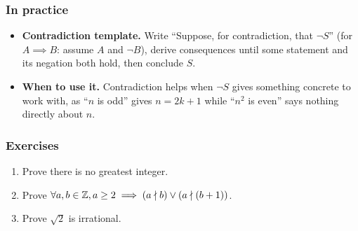\subsubsection*{In practice}
\begin{itemize}
    \item \textbf{Contradiction template.} Write ``Suppose, for contradiction, that $\neg S$'' (for $A\implies B$: assume $A$ and $\neg B$), derive consequences until some statement and its negation both hold, then conclude $S$.
    \item \textbf{When to use it.} Contradiction helps when $\neg S$ gives something concrete to work with, as ``$n$ is odd'' gives $n=2k+1$ while ``$n^2$ is even'' says nothing directly about $n$.
\end{itemize}

\subsubsection*{Exercises}
\begin{enumerate}
    \item Prove there is no greatest integer.
    \item Prove $\forall a, b \in \mathbb{Z}, a \geq 2 \implies \left(a \nmid b \right) \vee \left(a \nmid \left(b + 1\right)\right)$.
    \item Prove $\sqrt{2}$ is irrational.
\end{enumerate}

